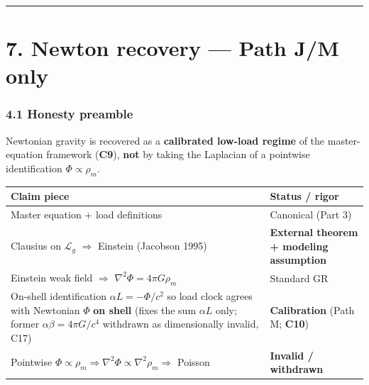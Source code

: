\documentclass[
  11pt,
]{article}
\newcounter{none} %
\begin{document}
\begin{center}\rule{0.5\linewidth}{0.5pt}\end{center}

\section{7. Newton recovery --- Path J/M
only}\label{newton-recovery-path-jm-only}

\subsubsection{4.1 Honesty preamble}\label{honesty-preamble}

Newtonian gravity is recovered as a \textbf{calibrated low-load regime}
of the master-equation framework (\textbf{C9}), \textbf{not} by taking
the Laplacian of a pointwise identification \(\Phi\propto\rho_m\).

{\def\LTcaptype{none} %
\begin{longtable}[]{@{}
  >{\raggedright\arraybackslash}p{}
  >{\raggedright\arraybackslash}p{}@{}}
\toprule\noalign{}
\begin{minipage}[b]{\linewidth}\raggedright
Claim piece
\end{minipage} & \begin{minipage}[b]{\linewidth}\raggedright
Status / rigor
\end{minipage} \\
\midrule\noalign{}
\endhead
\bottomrule\noalign{}
\endlastfoot
Master equation + load definitions & Canonical (Part 3) \\
Clausius on \(\mathcal{L}_g\) \(\Rightarrow\) Einstein (Jacobson 1995) &
\textbf{External theorem + modeling assumption} \\
Einstein weak field \(\Rightarrow\) \(\nabla^2\Phi=4\pi G\rho_m\) &
Standard GR \\
On-shell identification \(\alpha L=-\Phi/c^2\) so load clock agrees with
Newtonian \(\Phi\) \textbf{on shell} (fixes the sum \(\alpha L\) only; former
\(\alpha\beta=4\pi G/c^4\) withdrawn as dimensionally invalid, C17) & \textbf{Calibration} (Path M;
\textbf{C10}) \\
Pointwise
\(\Phi\propto\rho_m\Rightarrow\nabla^2\Phi\propto\nabla^2\rho_m\Rightarrow\)
Poisson & \textbf{Invalid / withdrawn} \\
\end{longtable}
}
\end{document}
